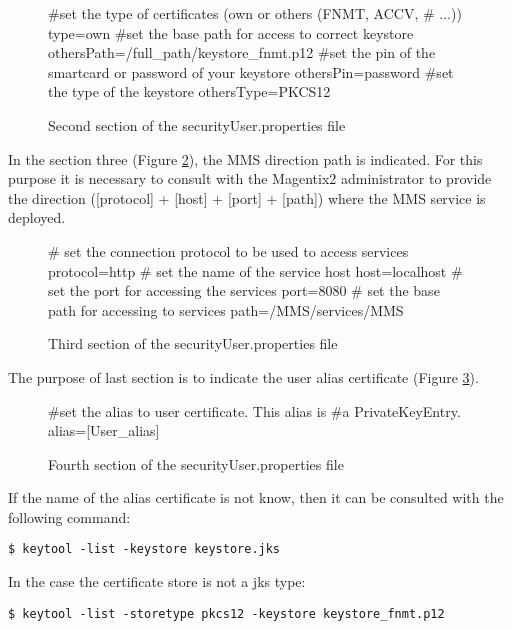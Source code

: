 \begin{itemize}
\begin{figure}[h!]
\begin{codigo}
    #set the type of certificates (own or others (FNMT, ACCV,
    # ...))
    type=own
    #set the base path for access to correct keystore
    othersPath=/full_path/keystore_fnmt.p12
    #set the pin of the smartcard or password of your keystore
    othersPin=password
    #set the type of the keystore
    othersType=PKCS12
\end{codigo}

\caption{Second section of the securityUser.properties file }
\label{fig:2ndsecurityUserProp}
\end{figure}


In the section three (Figure \ref{fig:3rdsecurityUserProp}), the MMS direction path is indicated. For this purpose it is necessary to consult with the Magentix2 administrator to provide the direction ([protocol] + [host] + [port] + [path]) where the MMS service is deployed. 

\begin{figure}[h!]
\begin{codigo}
    # set the connection protocol to be used to access services
    protocol=http
    # set the name of the service host
    host=localhost
    # set the port for accessing the services
    port=8080
    # set the base path for accessing to services
    path=/MMS/services/MMS
\end{codigo}
\caption{Third section of the securityUser.properties file }
\label{fig:3rdsecurityUserProp}
\end{figure}

The purpose of last section is to indicate the user alias certificate (Figure \ref{fig:4thsecurityUserProp}).

\begin{figure}[h!]
\begin{codigo}
#set the alias to user certificate. This alias is
#a PrivateKeyEntry.
alias=[User_alias]
\end{codigo}
\caption{Fourth section of the securityUser.properties file }
\label{fig:4thsecurityUserProp}
\end{figure}

\newpage
If the name of the alias certificate is not know, then it can be consulted with the following command:

\begin{verbatim}
$ keytool -list -keystore keystore.jks 
\end{verbatim}
In the case the certificate store is not a jks type: 
\begin{verbatim}
$ keytool -list -storetype pkcs12 -keystore keystore_fnmt.p12
\end{verbatim}


\end{itemize}
